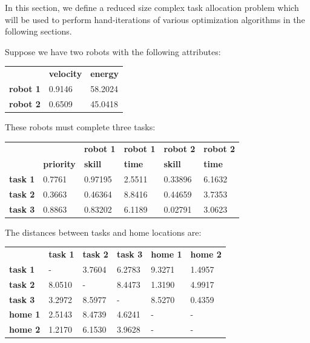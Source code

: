 \documentclass[a4paper]{article}
\begin{document}

In this section, we define a reduced size complex task allocation problem which
will be used to perform hand-iterations of various optimization algorithms in
the following sections.

Suppose we have two robots with the following attributes:

\begin{center}
\begin{tabular}{lll}
        & \textbf{velocity} & \textbf{energy} \\
\textbf{robot 1} & 0.9146   & 58.2024          \\
\textbf{robot 2} & 0.6509   & 45.0418
\end{tabular}
\end{center}
\vspace{1em}

These robots must complete three tasks:

\begin{center}
\begin{tabular}{llllll}
                &                   & \textbf{robot 1} & \textbf{robot 1} & \textbf{robot 2} & \textbf{robot 2} \\
                & \textbf{priority} & \textbf{skill}   & \textbf{time}    & \textbf{skill}   & \textbf{time} \\
\textbf{task 1} & 0.7761            & 0.97195          & 2.5511           & 0.33896          & 6.1632        \\
\textbf{task 2} & 0.3663            & 0.46364          & 8.8416           & 0.44659          & 3.7353        \\
\textbf{task 3} & 0.8863            & 0.83202          & 6.1189           & 0.02791          & 3.0623
\end{tabular}
\end{center}
\vspace{1em}

The distances between tasks and home locations are:

\begin{center}
\begin{tabular}{llllll}
                & \textbf{task 1} & \textbf{task 2} & \textbf{task 3} & \textbf{home 1} & \textbf{home 2} \\
\textbf{task 1} &   -             & 3.7604          & 6.2783          & 9.3271          & 1.4957 \\
\textbf{task 2} & 8.0510          &   -             & 8.4473          & 1.3190          & 4.9917 \\
\textbf{task 3} & 3.2972          & 8.5977          &   -             & 8.5270          & 0.4359 \\
\textbf{home 1} & 2.5143          & 8.4739          & 4.6241          &    -            &    -   \\
\textbf{home 2} & 1.2170          & 6.1530          & 3.9628          &    -            &    -
\end{tabular}
\end{center}
\end{document}
